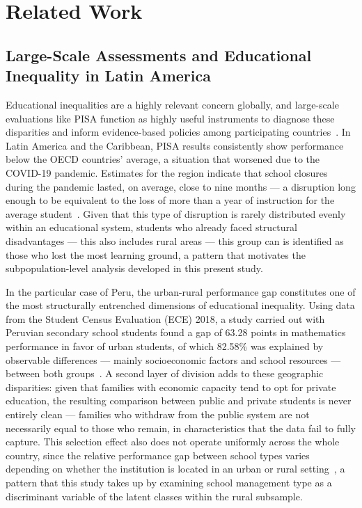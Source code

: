 \documentclass[runningheads]{llncs}
\begin{document}
\section{Related Work}
\label{sec:related}

\subsection{Large-Scale Assessments and Educational Inequality
in Latin America}

Educational inequalities are a highly relevant concern globally,
and large-scale evaluations like PISA function as highly useful
instruments to diagnose these disparities and inform
evidence-based policies among participating
countries~\cite{rutkowski2010secondary}. In Latin America and
the Caribbean, PISA results consistently show performance below
the OECD countries' average, a situation that worsened due to
the COVID-19 pandemic. Estimates for the region indicate that
school closures during the pandemic lasted, on average, close to
nine months --- a disruption long enough to be equivalent to the
loss of more than a year of instruction for the average
student~\cite{delprato2025resilience}. Given that this type of
disruption is rarely distributed evenly within an educational
system, students who already faced structural disadvantages ---
this also includes rural areas --- this group can is identified
as those who lost the most learning ground, a pattern that
motivates the subpopulation-level analysis developed in this
present study.

In the particular case of Peru, the urban-rural performance gap
constitutes one of the most structurally entrenched dimensions
of educational inequality. Using data from the Student Census
Evaluation (ECE) 2018, a study carried out with Peruvian
secondary school students found a gap of 63.28 points in
mathematics performance in favor of urban students, of which
82.58\% was explained by observable differences --- mainly
socioeconomic factors and school resources --- between both
groups~\cite{rojasapaza2024urbanrural}. A second layer of
division adds to these geographic disparities: given that
families with economic capacity tend to opt for private
education, the resulting comparison between public and private
students is never entirely clean --- families who withdraw from
the public system are not necessarily equal to those who remain,
in characteristics that the data fail to fully capture. This
selection effect also does not operate uniformly across the
whole country, since the relative performance gap between school
types varies depending on whether the institution is located in
an urban or rural setting~\cite{pagliarani2025schools}, a
pattern that this study takes up by examining school management
type as a discriminant variable of the latent classes within the
rural subsample.
\end{document}
